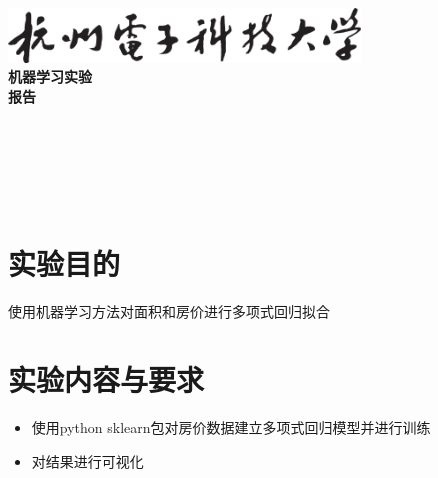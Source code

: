 \documentclass[a4paper]{ctexart}
\begin{document}
  \begin{titlepage}
      \songti
      \begin{center}
        \vspace*{2cm}
        \includegraphics[width=0.7\textwidth]{../HDU.png}\\
        \vspace*{1cm}
        {\fontsize{36pt}{0}
          \textbf{机器学习实验\\报\quad 告\\}
        }
        \vspace*{12cm}
        {\fontsize{18pt}{0}
           \underline{}\\
          \vspace*{0.5cm}
           \underline{}\\
          \vspace*{0.5cm}
           \underline{}\\
          \vspace*{0.5cm}
           \underline{}\\
          \vspace*{0.5cm}
           \underline{}\\
        }
      \end{center}
  \end{titlepage}


  \newpage
  \section{实验目的}
  使用机器学习方法对面积和房价进行多项式回归拟合

  \section{实验内容与要求}
  \begin{itemize}
    \item 使用python sklearn包对房价数据建立多项式回归模型并进行训练
    \item 对结果进行可视化
  \end{itemize}
\end{document}
